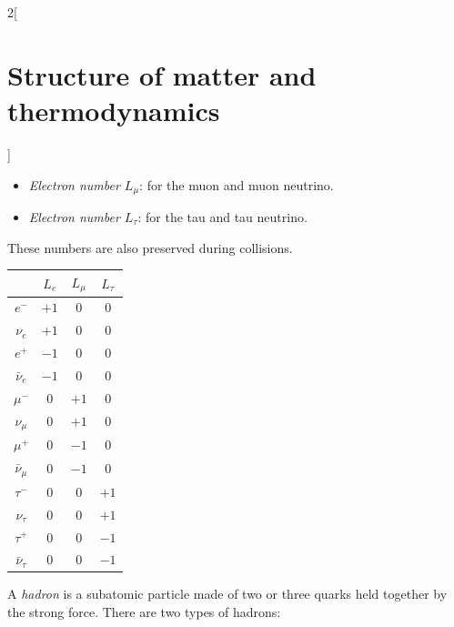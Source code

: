 \documentclass[../../../main.tex]{subfiles}
\begin{document}
\begin{multicols}{2}[\section{Structure of matter and thermodynamics}]
\begin{definition}
\begin{itemize}
            \item \textit{Electron number $L_\mu$}: for the muon and muon neutrino.
            \item \textit{Electron number $L_\tau$}: for the tau and tau neutrino.
        \end{itemize}
        These numbers are also preserved during collisions.
        \begin{center}
            \begin{minipage}{\linewidth}
                \centering
                \begin{tabular}{cccc}
                                     & $L_e$ & $L_\mu$ & $L_\tau$ \\
                    \hline
                    $e^-$            & $+1$  & 0       & 0        \\
                    $\nu_e$          & $+1$  & 0       & 0        \\
                    $e^+$            & $-1$  & 0       & 0        \\
                    $\bar{\nu}_e$    & $-1$  & 0       & 0        \\
                    $\mu^-$          & 0     & $+1$    & 0        \\
                    $\nu_\mu$        & 0     & $+1$    & 0        \\
                    $\mu^+$          & 0     & $-1$    & 0        \\
                    $\bar{\nu}_\mu$  & 0     & $-1$    & 0        \\
                    $\tau^-$         & 0     & 0       & $+1$     \\
                    $\nu_\tau$       & 0     & 0       & $+1$     \\
                    $\tau^+$         & 0     & 0       & $-1$     \\
                    $\bar{\nu}_\tau$ & 0     & 0       & $-1$     \\
                \end{tabular}
            \end{minipage}
        \end{center}
    \end{definition}
    \begin{definition}[Hadron]
        A \textit{hadron} is a subatomic particle made of two or three quarks held together by the strong force. There are two types of hadrons:
        \begin{itemize}

\end{itemize}
\end{definition}
\end{multicols}
\end{document}

